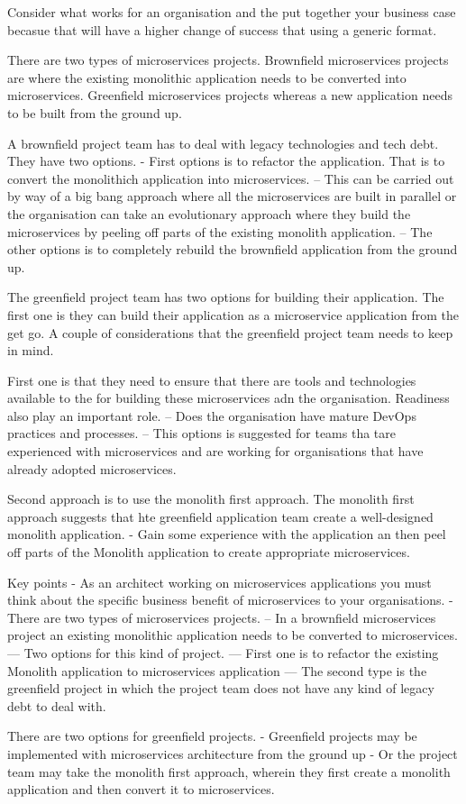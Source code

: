 Consider what works for an organisation and the put together your business case becasue that will have a higher change of success that using a generic format.


There are two types of microservices projects.
Brownfield microservices projects are where the existing monolithic application needs to be converted into microservices.
Greenfield microservices projects whereas a new application needs to be built from the ground up.

A brownfield project team has to deal with legacy technologies and tech debt. They have two options.
- First options is to refactor the application. That is to convert the monolithich application into microservices.
-- This can be carried out by way of a big bang approach where all the microservices are built in parallel or the organisation can take an evolutionary approach where they build the microservices by peeling off parts of the existing monolith application.
-- The other options is to completely rebuild the brownfield application from the ground up.

The greenfield project team has two options for building their application.
The first one is they can build their application as a microservice application from the get go.
A couple of considerations that the greenfield project team needs to keep in mind.

First one is that they need to ensure that there are tools and technologies available to the for building these microservices adn the organisation.
Readiness also play an important role.
-- Does the organisation have mature DevOps practices and processes.
-- This options is suggested for teams tha tare experienced with microservices and are working for organisations that have already adopted microservices.

Second approach is to use the monolith first approach.
The monolith first approach suggests that hte greenfield application team create a well-designed monolith application.
- Gain some experience with the application an then peel off parts of the Monolith application to create appropriate microservices.

Key points
- As an architect working on microservices applications you must think about the specific business benefit of microservices to your organisations.
- There are two types of microservices projects.
-- In a brownfield microservices project an existing monolithic application needs to be converted to microservices.
--- Two options for this kind of project.
--- First one is to refactor the existing Monolith application to microservices application
--- The second type is the greenfield project in which the project team does not have any kind of legacy debt to deal with.

There are two options for greenfield projects.
- Greenfield projects may be implemented with microservices architecture from the ground up
- Or the project team may take the monolith first approach, wherein they first create a monolith application and then convert it to microservices.

